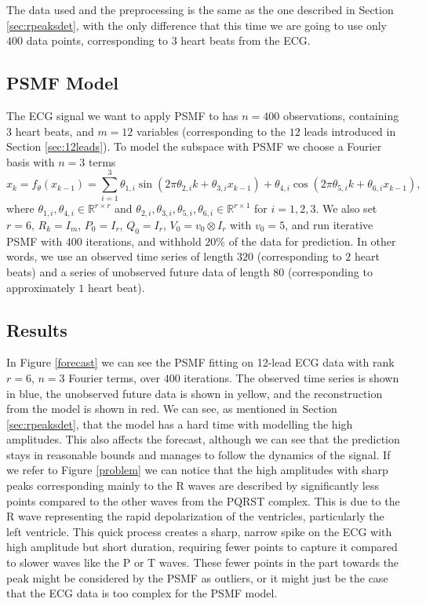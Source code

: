 \documentclass{mldsmsc}
\begin{document}
The data used and the preprocessing is the same as the one described in Section \ref{sec:rpeaksdet}, with the only difference that this time we are going to use only $400$ data points, corresponding to $3$ heart beats from the ECG.

\subsection{PSMF Model}\label{exp3:psmfmodel}

The ECG signal we want to apply PSMF to has $n = 400$ observations, containing $3$ heart beats, and $m = 12$ variables (corresponding to the $12$ leads introduced in Section \ref{sec:12leads}). To model the subspace with PSMF we choose a Fourier basis with $n = 3$ terms
\begin{equation}
    x_k = f_{\theta}(x_{k-1}) = \sum_{i=1}^3 \theta_{1,i} \sin(2\pi \theta_{2,i} k + \theta_{3,i} x_{k-1}) + \theta_{4,i} \cos(2\pi \theta_{5,i} k + \theta_{6,i} x_{k-1}),
\end{equation}
where $\theta_{1,i}, \theta_{4,i} \in \mathbb{R}^{r \times r}$ and $\theta_{2,i}, \theta_{3,i}, \theta_{5,i}, \theta_{6,i} \in \mathbb{R}^{r \times 1}$ for $i = 1, 2, 3$. We also set $r = 6$, $R_k = I_m$, $P_0 = I_r$, $Q_0 = I_r$, $V_0 = v_0 \otimes I_r$ with $v_0 = 5$, and run iterative PSMF with $400$ iterations, and withhold $20\%$ of the data for prediction. In other words, we use an observed time series of length $320$ (corresponding to $2$ heart beats) and a series of unobserved future data of length $80$ (corresponding to approximately $1$ heart beat). \newline

\subsection{Results}

\noindent In Figure \ref{forecast} we can see the PSMF fitting on 12-lead ECG data with rank $r = 6$, $n = 3$ Fourier terms, over $400$ iterations. The observed time series is shown in blue, the unobserved future data is shown in yellow, and the reconstruction from the model is shown in red. We can see, as mentioned in Section \ref{sec:rpeaksdet}, that the model has a hard time with modelling the high amplitudes. This also affects the forecast, although we can see that the prediction stays in reasonable bounds and manages to follow the dynamics of the signal. If we refer to Figure \ref{problem} we can notice that the high amplitudes with sharp peaks corresponding mainly to the R waves are described by significantly less points compared to the other waves from the PQRST complex. This is due to the R wave representing the rapid depolarization of the ventricles, particularly the left ventricle. This quick process creates a sharp, narrow spike on the ECG with high amplitude but short duration, requiring fewer points to capture it compared to slower waves like the P or T waves. These fewer points in the part towards the peak might be considered by the PSMF as outliers, or it might just be the case that the ECG data is too complex for the PSMF model. \newline
\end{document}
